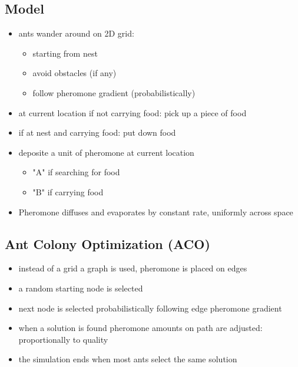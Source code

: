\documentclass[a4paper,12pt,answers]{article}
\begin{document}
	\subsection{Model}
	\begin{itemize}
		\item ants wander around on 2D grid:
		\begin{itemize}
			\item starting from nest
			\item avoid obstacles (if any)
			\item follow pheromone gradient (probabilistically)
		\end{itemize}
		\item at current location if not carrying food: pick up a piece of food
		\item if at nest and carrying food: put down food
		\item deposite a unit of pheromone at current location
		\begin{itemize}
			\item "A" if searching for food
			\item "B" if carrying food
		\end{itemize}
		\item Pheromone diffuses and evaporates by constant rate, uniformly across space
	\end{itemize}

	
	\subsection{Ant Colony Optimization (ACO)}
	\begin{itemize}
		\item instead of a grid a graph is used, pheromone is placed on edges
		\item a random starting node is selected
		\item next node is selected probabilistically following edge pheromone gradient
		\item when a solution is found pheromone amounts on path are adjusted: proportionally to quality
		\item the simulation ends when most ants select the same solution 
	\end{itemize}
	
	
	
	\newpage
\end{document}
